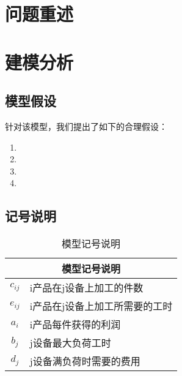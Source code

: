 \documentclass[nocover]{cumcmart}%
\begin{document}


\title{}
\maketitle






\section{问题重述}

\section{建模分析}

\subsection{模型假设}
针对该模型，我们提出了如下的合理假设：
\begin{enumerate}
\item 
\item 
\item 
\item 
\end{enumerate}

\subsection{记号说明}
\begin{table}[!htbp]
    \centering
    \begin{tabular}{cl}
    \toprule
    \multicolumn{2}{c}{\large 模型记号说明}\\
    \midrule
    ${c_{ij}}$ &  i产品在j设备上加工的件数 \\
    ${e_{ij}}$ &  i产品在j设备上加工所需要的工时 \\
    ${a_i}$    &  i产品每件获得的利润 \\
    ${b_j}$    &  j设备最大负荷工时 \\
    ${d_j}$    &  j设备满负荷时需要的费用 \\
    \bottomrule
    \end{tabular}
    \caption{模型记号说明}
\end{table}
\end{document}
